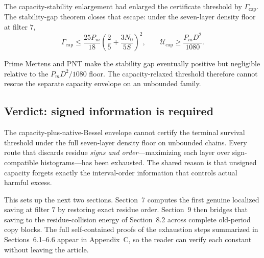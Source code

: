 The capacity-stability enlargement had enlarged the certificate threshold by
$\Gamma_{\mathrm{cap}}$. The stability-gap theorem closes that escape: under
the seven-layer density floor at filter $7$,
\begin{equation*}
\Gamma_{\mathrm{cap}}\le\frac{25P_m}{18}\left(\frac25+\frac{3N_0}{5S}\right)^2,
\qquad
\mathcal U_{\mathrm{cap}}\ge\frac{P_mD^2}{1080}.
\end{equation*}

Prime Mertens and PNT make the stability gap eventually positive but
negligible relative to the $P_mD^2/1080$ floor. The capacity-relaxed
threshold therefore cannot rescue the separate capacity envelope on an
unbounded family.

\subsection{Verdict: signed information is required}
\label{sec:verdict-signed-information}

The capacity-plus-native-Bessel envelope cannot certify the terminal
survival threshold under the full seven-layer density floor on unbounded
chains. Every route that discards residue \emph{signs and order}---maximizing each
layer over sign-compatible histograms---has been exhausted. The shared reason
is that unsigned capacity forgets exactly the interval-order information that
controls actual harmful excess.

This sets up the next two sections. Section~7 computes the first genuine localized
saving at filter $7$ by restoring exact residue order. Section~9 then bridges that
saving to the residue-collision energy of Section~8.2 across complete old-period
copy blocks. The full self-contained
proofs of the exhaustion steps summarized in Sections~6.1--6.6 appear in
Appendix~C, so the reader can verify each constant without leaving the
article.
